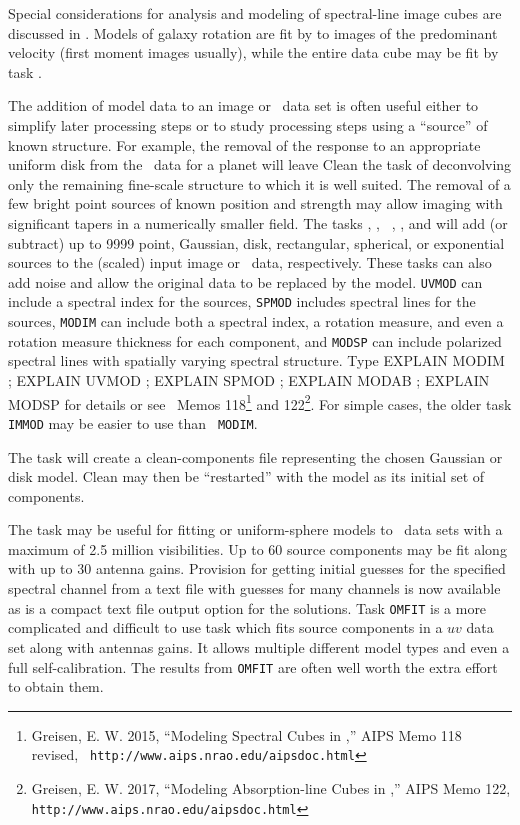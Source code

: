 
     Special considerations for analysis and modeling of spectral-line
image cubes are discussed in .  Models of galaxy rotation
are fit by {\tt {}} to images of the predominant velocity
(first moment images usually), while the entire data cube may be fit
by task {\tt {}}\@.

     The addition of model data to an image or \uv\ data set is often
useful either to simplify later processing steps or to study
processing steps using a ``source'' of known structure.  For example,
the removal of the response to an appropriate uniform disk from the
\uv\ data for a planet will leave Clean the task of deconvolving only
the remaining fine-scale structure to which it is well suited.  The
removal of a few bright point sources of known position and strength
may allow imaging with significant tapers in a numerically smaller
field.  The tasks {\tt {}}, {\tt {}}, {\tt
{}}, {\tt {}}, and {\tt {}} will add (or
subtract) up to 9999 point, Gaussian, disk, rectangular, spherical, or
exponential sources to the (scaled) input image or \uv\ data,
respectively.  These tasks can also add noise and allow the original
data to be replaced by the model.  {\tt UVMOD} can include a spectral
index for the sources, {\tt SPMOD} includes spectral lines for the
sources, {\tt MODIM} can include both a spectral index, a rotation
measure, and even a rotation measure thickness for each component, and
{\tt MODSP} can include polarized spectral lines with spatially
varying spectral structure. Type {\us EXPLAIN MODIM ; EXPLAIN UVMOD ;
EXPLAIN SPMOD ; EXPLAIN MODAB ; EXPLAIN MODSP \CR} for details or see
\AIPS\ Memos 118\footnote{Greisen, E. W. 2015, ``Modeling Spectral
Cubes in \AIPS,'' AIPS Memo 118 revised, {\tt
http://www.aips.nrao.edu/aipsdoc.html}} and 122\footnote{Greisen, E. W.
2017, ``Modeling Absorption-line Cubes in \AIPS,'' AIPS Memo 122, {\tt
http://www.aips.nrao.edu/aipsdoc.html}}.  For simple cases, the older
task {\tt IMMOD} may be easier to use than {\tt
MODIM}\@.

     The task {\tt {}} will create a clean-components file
representing the chosen Gaussian or disk model.  Clean may then be
``restarted'' with the model as its initial set of components.

The task {\tt {}} may be useful for fitting 
or uniform-sphere models to \uv\ data sets with a maximum of 2.5
million visibilities.  Up to 60 source components may be fit along
with up to 30 antenna gains.  Provision for getting initial guesses
for the specified spectral channel from a text file with guesses for
many channels is now available as is a compact text file output option
for the solutions.  Task {\tt OMFIT} is a more complicated and
difficult to use task which fits source components in a $uv$ data set
along with antennas gains.  It allows multiple different model types
and even a full self-calibration.  The results from {\tt OMFIT} are
often well worth the extra effort to obtain them.

